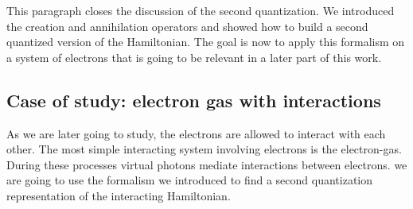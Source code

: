 \documentclass[../main.tex]{subfile}
\begin{document}
This paragraph closes the discussion of the second quantization. We introduced the creation and annihilation operators and showed how to build a 
second quantized version of the Hamiltonian. The goal is now to apply this formalism on a system of electrons that is going to be relevant in a later part of this work.


\subsection{Case of study: electron gas with interactions}
As we are later going to study, the electrons are allowed to interact with each other. The most simple interacting system involving electrons is the electron-gas.
During these processes virtual photons mediate interactions between electrons. we are going to use the formalism we introduced to 
find a second quantization representation of the interacting Hamiltonian.\\
\end{document}
